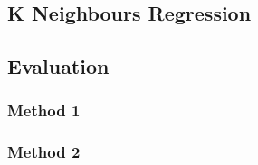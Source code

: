\par 



\subsection{K Neighbours Regression}

\subsection{Evaluation}
\subsubsection{Method 1}
\subsubsection{Method 2}

